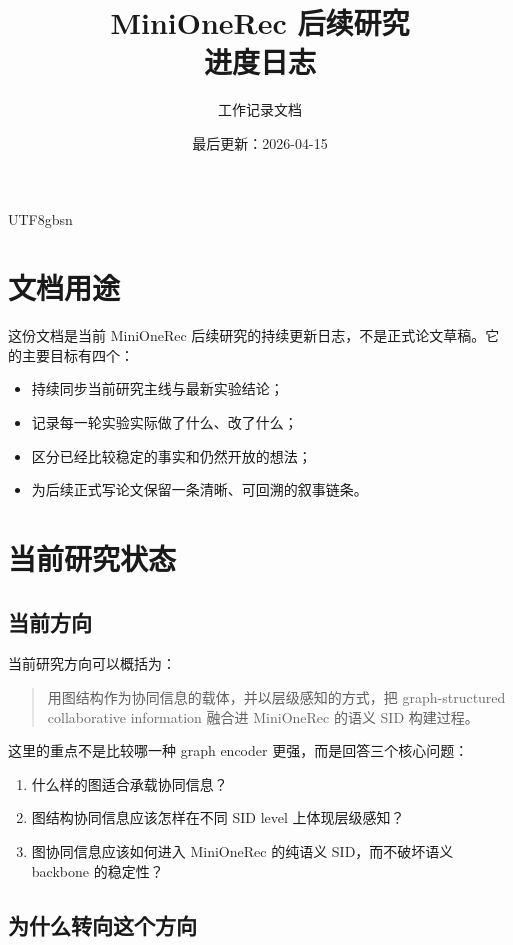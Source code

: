 \documentclass[11pt]{article}
\title{MiniOneRec 后续研究\\进度日志}
\author{工作记录文档}
\date{最后更新：2026-04-15}
\begin{document}
\begin{CJK*}{UTF8}{gbsn}
\maketitle

\section{文档用途}

这份文档是当前 MiniOneRec 后续研究的持续更新日志，不是正式论文草稿。它的主要目标有四个：

\begin{itemize}
  \item 持续同步当前研究主线与最新实验结论；
  \item 记录每一轮实验实际做了什么、改了什么；
  \item 区分已经比较稳定的事实和仍然开放的想法；
  \item 为后续正式写论文保留一条清晰、可回溯的叙事链条。
\end{itemize}

\section{当前研究状态}

\subsection{当前方向}

当前研究方向可以概括为：

\begin{quote}
用图结构作为协同信息的载体，并以层级感知的方式，把 graph-structured collaborative information 融合进 MiniOneRec 的语义 SID 构建过程。
\end{quote}

这里的重点不是比较哪一种 graph encoder 更强，而是回答三个核心问题：

\begin{enumerate}
  \item 什么样的图适合承载协同信息？
  \item 图结构协同信息应该怎样在不同 SID level 上体现层级感知？
  \item 图协同信息应该如何进入 MiniOneRec 的纯语义 SID，而不破坏语义 backbone 的稳定性？
\end{enumerate}

\subsection{为什么转向这个方向}


\end{CJK*}
\end{document}
